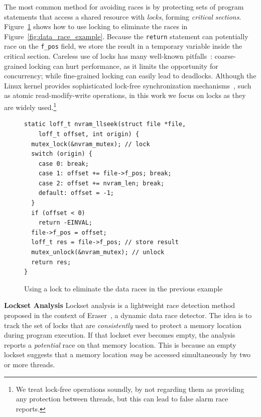 The most common method for avoiding races is by protecting sets of program statements that access a shared resource with \emph{locks}, forming \emph{critical sections}.  Figure~\ref{fig:lock_example} shows how to use locking to eliminate the races in Figure~\ref{fig:data_race_example}. Because the \texttt{return} statement can potentially race on the \texttt{f\_pos} field, we store the result in a temporary variable inside the critical section.
%
Careless use of locks has many well-known pitfalls~\cite{sutter2005software}: coarse-grained locking can hurt performance, as it limits the opportunity for concurrency; while fine-grained locking can easily lead to deadlocks. Although the Linux kernel provides sophisticated lock-free synchronization mechanisms~\cite[p.\ 123]{corbet2005linux}, such as atomic read-modify-write operations, in this work we focus on locks as they are widely used.\footnote{We treat lock-free operations soundly, by not regarding them as providing any protection between threads, but this can lead to false alarm race reports.}

\begin{figure}[t]
\begin{lstlisting}
static loff_t nvram_llseek(struct file *file,
    loff_t offset, int origin) {
  mutex_lock(&nvram_mutex); // lock
  switch (origin) {
    case 0: break;
    case 1: offset += file->f_pos; break;
    case 2: offset += nvram_len; break;
    default: offset = -1;
  }
  if (offset < 0)
    return -EINVAL;
  file->f_pos = offset;
  loff_t res = file->f_pos; // store result
  mutex_unlock(&nvram_mutex); // unlock
  return res;
}
\end{lstlisting}
\vspace{-2mm}
\caption{Using a lock to eliminate the data races in the previous example}
\label{fig:lock_example}
\vspace{-2mm}
\end{figure}

\noindent\textbf{Lockset Analysis }
%
Lockset analysis is a lightweight race detection method proposed in the context of Eraser~\cite{savage1997eraser}, a dynamic data race detector.  The idea is to track the set of locks that are \emph{consistently} used to protect a memory location during program execution. If that lockset ever becomes empty, the analysis reports a \emph{potential} race on that memory location. This is because an empty lockset suggests that a memory location \emph{may} be accessed simultaneously by two or more threads.  

